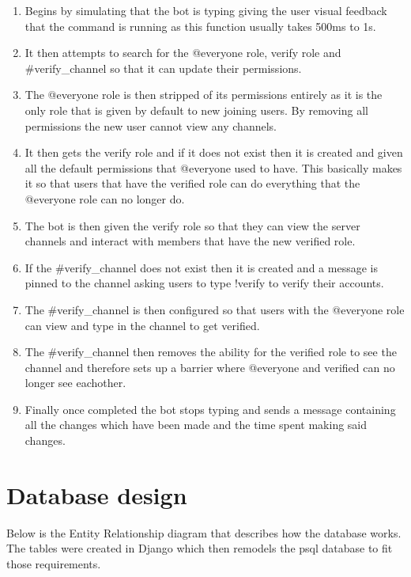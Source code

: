 \begin{enumerate}
	\item Begins by simulating that the bot is typing giving the user visual feedback that the command is running as this function usually takes 500ms to 1s.
	\item It then attempts to search for the @everyone role, verify role and \#verify\_channel so that it can update their permissions.
	\item The @everyone role is then stripped of its permissions entirely as it is the only role that is given by default to new joining users. By removing all permissions the new user cannot view any channels.
	\item It then gets the verify role and if it does not exist then it is created and given all the default permissions that @everyone used to have. This basically makes it so that users that have the verified role can do everything that the @everyone role can no longer do.
	\item The bot is then given the verify role so that they can view the server channels and interact with members that have the new verified role.
	\item If the \#verify\_channel does not exist then it is created and a message is pinned to the channel asking users to type !verify to verify their accounts.
	\item The \#verify\_channel is then configured so that users with the @everyone role can view and type in the channel to get verified.
	\item The \#verify\_channel then removes the ability for the verified role to see the channel and therefore sets up a barrier where @everyone and verified can no longer see eachother.
	\item Finally once completed the bot stops typing and sends a message containing all the changes which have been made and the time spent making said changes.
\end{enumerate}

\section{Database design}\label{sec2:database}
Below is the Entity Relationship diagram that describes how the database works. The tables were created in Django which then remodels the psql \cite{psql} database to fit those requirements. 

